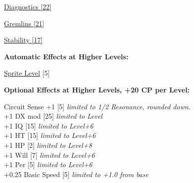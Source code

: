 \begin{multicols*}{3}
\hyperref[diagnostics]{Diagnostics [22]}

\hyperref[gremlins]{Gremlins [21]}

\hyperref[stability]{Stability [17]}

\textbf{Automatic Effects at Higher Levels:}

\hyperref[sprite_level]{Sprite Level} [5]

\textbf{Optional Effects at Higher Levels, +20 CP per Level:}

Circuit Sense +1 [5] \textit{limited to 1/2 Resonance, rounded down.}\\
+1 DX mod [25] \textit{limited to Level}\\
+1 IQ [15] \textit{limited to Level+6}\\
+1 HT [15] \textit{limited to Level+6}\\
+1 HP [2] \textit{limited to Level+8}\\
+1 Will [7] \textit{limited to Level+6}\\
+1 Per [5] \textit{limited to Level+6}\\
+0.25 Basic Speed [5] \textit{limited to +1.0 from base}\\
	
\end{multicols*}